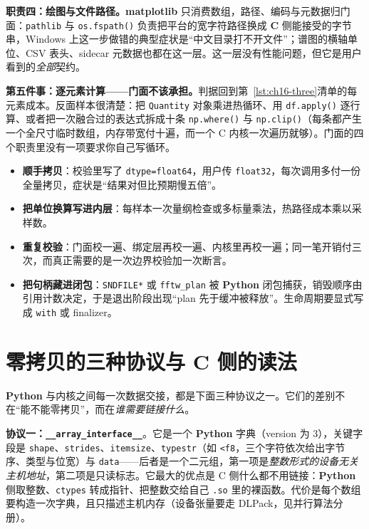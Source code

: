 \documentclass[12pt,a4paper,fontset=fandol]{ctexbook}
\newcommand{\Fn}[1]{\texttt{#1()}}
\newcommand{\Tp}[1]{\texttt{#1}}
\newcommand{\Bk}{\allowbreak}
\newcommand{\Lib}[1]{\textbf{#1}}
\newcommand{\Lang}[1]{\textsf{\bfseries #1}}
\newcommand{\CL}{\Lang{C}}
\newcommand{\PY}{\Lang{Python}}
\begin{document}
\textbf{职责四：绘图与文件路径。}\Lib{matplotlib} 只消费数组，路径、编码与元数据归门面：\Tp{pathlib} 与 \Fn{os.fspath} 负责把平台的宽字符路径换成 \CL{} 侧能接受的字节串，Windows 上这一步做错的典型症状是``中文目录打不开文件''；谱图的横轴单位、CSV 表头、sidecar 元数据也都在这一层。这一层没有性能问题，但它是用户看到的\emph{全部}契约。

\textbf{第五件事：逐元素计算——门面不该承担。}判据回到第~\ref{lst:ch16-three}清单的每元素成本。反面样本很清楚：把 \Tp{Quantity} 对象乘进热循环、用 \Fn{df.apply} 逐行算、或者把一次融合过的表达式拆成十条 \Fn{np.where} 与 \Fn{np.clip}（每条都产生一个全尺寸临时数组，内存带宽付十遍，而一个 C 内核一次遍历就够）。门面的四个职责里没有一项要求你自己写循环。

\begin{warning}[title={门面的四种越权写法}]
\begin{itemize}
\item \textbf{顺手拷贝}：校验里写了 \Tp{dtype=\allowbreak float64}，用户传 \Tp{float32}，每次调用多付一份全量拷贝，症状是``结果对但比预期慢五倍''。
\item \textbf{把单位换算写进内层}：每样本一次量纲检查或多标量乘法，热路径成本乘以采样数。
\item \textbf{重复校验}：门面校一遍、绑定层再校一遍、内核里再校一遍；同一笔开销付三次，而真正需要的是一次边界校验加一次断言。
\item \textbf{把句柄藏进闭包}：\Tp{SNDFILE*} 或 \Tp{fftw\_plan} 被 \PY{} 闭包捕获，销毁顺序由引用计数决定，于是退出阶段出现``plan 先于缓冲被释放''。生命周期要显式写成 \Tp{with} 或 finalizer。
\end{itemize}
\end{warning}

\section{零拷贝的三种协议与 C 侧的读法}

\PY{} 与内核之间每一次数据交接，都是下面三种协议之一。它们的差别不在``能不能零拷贝''，而在\emph{谁需要链接什么}。

\textbf{协议一：\Tp{\_\_array\_interface\Bk\_\_}}。它是一个 \PY{} 字典（version 为 3），关键字段是 \Tp{shape}、\Tp{strides}、\Tp{itemsize}、\Tp{typestr}（如 \Tp{<f8}，三个字符依次给出字节序、类型与位宽）与 \Tp{data}——后者是一个二元组，第一项是\emph{整数形式的设备无关主机地址}，第二项是只读标志。它最大的优点是 C 侧什么都不用链接：\PY{} 侧取整数、\Tp{ctypes} 转成指针、把整数交给自己 \Tp{.so} 里的裸函数。代价是每个数组要构造一次字典，且只描述主机内存（设备张量要走 DLPack，见并行算法分册）。
\end{document}
